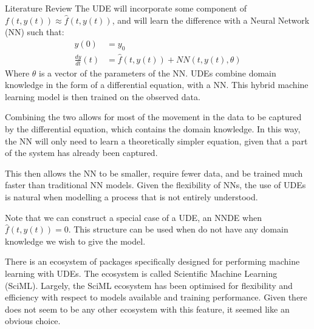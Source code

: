 \documentclass[12pt]{amsbook}
\begin{document}
\begin{chapter}{Literature Review}
            The UDE will incorporate some component of $f(t,y(t))\approx \hat f(t,y(t))$, and will learn the difference with a Neural Network (NN) such that:
            \begin{align}
                \label{UDE}
                y(0) &= y_0 \\
                \frac{dy}{dt}(t)&=\hat f(t,y(t))+NN(t,y(t), \theta)
            \end{align}
            Where $\theta$ is a vector of the parameters of the NN.
            UDEs combine domain knowledge in the form of a differential equation, with a NN. This hybrid machine learning model is then trained on the observed data.
            
            Combining the two allows for most of the movement in the data to be captured by the differential equation, which contains the domain knowledge. In this way, the NN will only need to learn a theoretically simpler equation, given that a part of the system has already been captured. 
            
            This then allows the NN to be smaller, require fewer data, and be trained much faster than traditional NN models. Given the flexibility of NNs, the use of UDEs is natural when modelling a process that is not entirely understood\cite{kidger2022neural}.

            Note that we can construct a special case of a UDE, an NNDE when $\hat f(t,y(t))=0$. This structure can be used when do not have any domain knowledge we wish to give the model.
            
            There is an ecosystem of packages specifically designed for performing machine learning with UDEs. The ecosystem is called Scientific Machine Learning (SciML)\cite{SciML_C_Rak}. Largely, the SciML ecosystem has been optimised for flexibility and efficiency with respect to models available and training performance. Given there does not seem to be any other ecosystem with this feature, it seemed like 
            an obvious choice.
        

\end{chapter}
\end{document}
